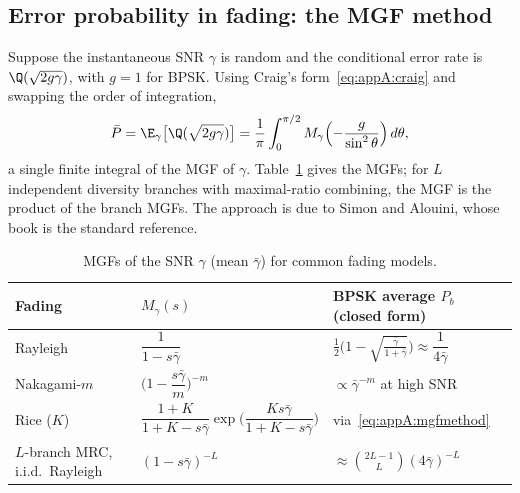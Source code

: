 

\subsection{Error probability in fading: the MGF method}
\label{sec:appA:mgfmethod}

Suppose the instantaneous SNR $\gamma$ is random and the conditional error rate is
$\Q(\sqrt{2g\gamma})$, with $g=1$ for BPSK. Using Craig's form~\eqref{eq:appA:craig} and swapping
the order of integration,
\begin{equation}
\bar P=\E_\gamma\big[\Q(\sqrt{2g\gamma})\big]=\frac1\pi\int_0^{\pi/2}M_\gamma\!\left(-\frac{g}{\sin^2\theta}\right)d\theta,
\label{eq:appA:mgfmethod}
\end{equation}
a single finite integral of the MGF of $\gamma$. Table~\ref{tab:appA:mgf} gives the MGFs; for
$L$ independent diversity branches with maximal-ratio combining, the MGF is the product of the
branch MGFs. The approach is due to Simon and Alouini, whose book is the standard reference.

\begin{table}[htbp]\centering\small
\caption{MGFs of the SNR $\gamma$ (mean $\bar\gamma$) for common fading models.}\label{tab:appA:mgf}
\renewcommand{\arraystretch}{1.5}
\begin{tabular}{@{}lll@{}}
\toprule
Fading & $M_\gamma(s)$ & BPSK average $P_b$ (closed form)\\
\midrule
Rayleigh & $\dfrac{1}{1-s\bar\gamma}$ & $\tfrac12\Big(1-\sqrt{\tfrac{\bar\gamma}{1+\bar\gamma}}\Big)\approx\dfrac1{4\bar\gamma}$\\
Nakagami-$m$ & $\Big(1-\dfrac{s\bar\gamma}{m}\Big)^{-m}$ & $\propto\bar\gamma^{-m}$ at high SNR\\
Rice ($K$) & $\dfrac{1+K}{1+K-s\bar\gamma}\exp\!\Big(\dfrac{Ks\bar\gamma}{1+K-s\bar\gamma}\Big)$ & via~\eqref{eq:appA:mgfmethod}\\
$L$-branch MRC, i.i.d.\ Rayleigh & $(1-s\bar\gamma)^{-L}$ & $\approx\binom{2L-1}{L}(4\bar\gamma)^{-L}$\\
\bottomrule
\end{tabular}
\end{table}

